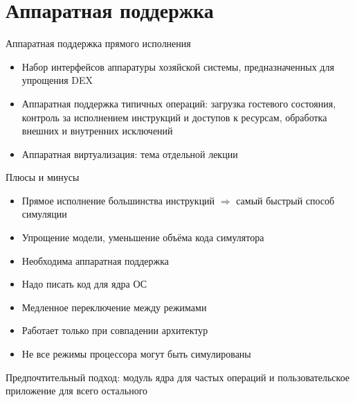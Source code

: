 \section{Аппаратная поддержка}

\begin{frame}{Аппаратная поддержка прямого исполнения}
\begin{itemize}
    \item Набор интерфейсов аппаратуры хозяйской системы, предназначенных для упрощения DEX
    \item Аппаратная поддержка типичных операций: загрузка гостевого состояния, контроль за исполнением инструкций и доступов к ресурсам, обработка внешних и внутренних исключений
    \item Аппаратная виртуализация: тема отдельной лекции
\end{itemize}
\end{frame}

\begin{frame}{Плюсы и минусы}
\begin{itemize}
    \item Прямое исполнение большинства инструкций $\Rightarrow$ самый быстрый способ симуляции
    \item Упрощение модели, уменьшение объёма кода симулятора
\end{itemize}

\begin{itemize}
    \item Необходима аппаратная поддержка
    \item Надо писать код для ядра ОС
    \item Медленное переключение между режимами %
    \item Работает только при совпадении архитектур
    \item Не все режимы процессора могут быть симулированы
\end{itemize}

Предпочтительный подход: модуль ядра для частых операций и пользовательское приложение для всего остального

\end{frame}


